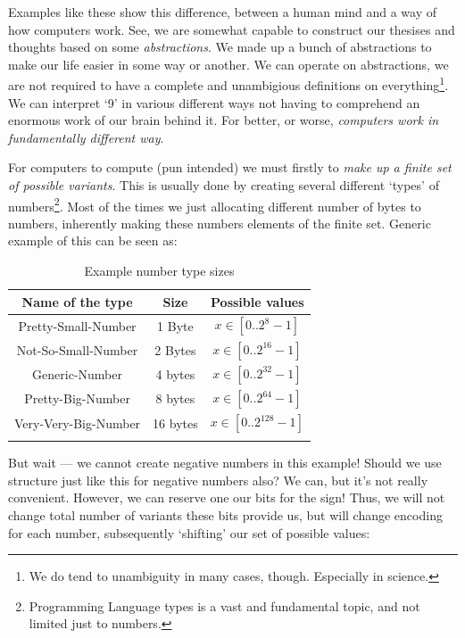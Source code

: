 \documentclass{report}
\begin{document}
            Examples like these show this difference, between a human mind and a way of how computers work. See, we are somewhat capable to construct our thesises and thoughts
            based on some \emph{abstractions}. We made up a bunch of abstractions to make our life easier in some way or another. We can operate on abstractions, we are not required
            to have a complete and unambigious definitions on everything\footnote{We do tend to unambiguity in many cases, though. Especially in science.}. We can interpret `9' in various
            different ways not having to comprehend an enormous work of our brain behind it. For better, or worse, \emph{computers work in fundamentally different way}.
            
            For computers to compute (pun intended) we must firstly to \emph{make up a finite set of possible variants}. This is usually done by creating several different
            `types' of numbers\footnote{Programming Language types is a vast and fundamental topic, and not limited just to numbers.}. Most of the times we just allocating 
            different number of bytes to numbers, inherently making these numbers elements of the finite set. Generic example of this can be seen as:
            
            \begin{table}[H]
                \centering
                \begin{longtable}{|c|c|c|}
                    \hline
                    Name of the type & Size & Possible values \\\hline
                    Pretty-Small-Number & 1 Byte & $x \in [0..2^8 - 1]$ \\\hline
                    Not-So-Small-Number & 2 Bytes & $x \in [0..2^{16} - 1]$\\\hline
                    Generic-Number & 4 bytes & $x \in [0..2^{32} - 1]$\\\hline
                    Pretty-Big-Number & 8 bytes & $x \in [0..2^{64} - 1]$\\\hline
                    Very-Very-Big-Number & 16 bytes & $x \in [0..2^{128} - 1]$\\\hline
                    \caption{Example number type sizes}

                \end{longtable}
            \end{table}
            
            But wait --- we cannot create negative numbers in this example! Should we use structure just like this for negative numbers also? We can, but it's not really convenient.
            However, we can reserve one our bits for the sign! Thus, we will not change total number of variants these bits provide us, but will change encoding for each number, subsequently
            `shifting' our set of possible values:
\end{document}
